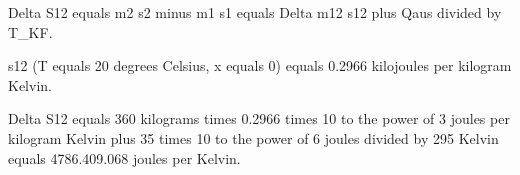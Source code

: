 Delta S12 equals m2 s2 minus m1 s1 equals Delta m12 s12 plus Qaus divided by T_KF.  

s12 (T equals 20 degrees Celsius, x equals 0) equals 0.2966 kilojoules per kilogram Kelvin.  

Delta S12 equals 360 kilograms times 0.2966 times 10 to the power of 3 joules per kilogram Kelvin plus 35 times 10 to the power of 6 joules divided by 295 Kelvin equals 4786.409.068 joules per Kelvin.